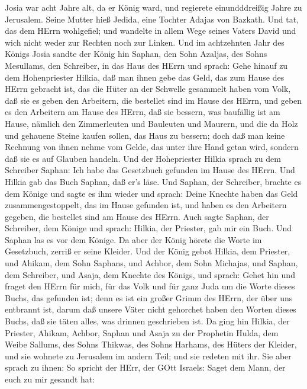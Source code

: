  Josia war acht Jahre alt, da er König ward, und regierete
einundddreißig Jahre zu Jerusalem. Seine Mutter hieß Jedida, eine
Tochter Adajas von Bazkath.  Und tat, das dem HErrn
wohlgefiel; und wandelte in allem Wege seines Vaters David und wich
nicht weder zur Rechten noch zur Linken.  Und im achtzehnten
Jahr des Königs Josia sandte der König hin Saphan, den Sohn Azaljas, des
Sohns Mesullams, den Schreiber, in das Haus des HErrn und sprach:
 Gehe hinauf zu dem Hohenpriester Hilkia, daß man ihnen gebe
das Geld, das zum Hause des HErrn gebracht ist, das die Hüter an der
Schwelle gesammelt haben vom Volk,  daß sie es geben den
Arbeitern, die bestellet sind im Hause des HErrn, und geben es den
Arbeitern am Hause des HErrn, daß sie bessern, was baufällig ist am
Hause,  nämlich den Zimmerleuten und Bauleuten und Maurern,
und die da Holz und gehauene Steine kaufen sollen, das Haus zu bessern;
 doch daß man keine Rechnung von ihnen nehme vom Gelde, das
unter ihre Hand getan wird, sondern daß sie es auf Glauben handeln.
 Und der Hohepriester Hilkia sprach zu dem Schreiber Saphan:
Ich habe das Gesetzbuch gefunden im Hause des HErrn. Und Hilkia gab das
Buch Saphan, daß er's läse.  Und Saphan, der Schreiber,
brachte es dem Könige und sagte es ihm wieder und sprach: Deine Knechte
haben das Geld zusammengestoppelt, das im Hause gefunden ist, und haben
es den Arbeitern gegeben, die bestellet sind am Hause des HErrn.
 Auch sagte Saphan, der Schreiber, dem Könige und sprach:
Hilkia, der Priester, gab mir ein Buch. Und Saphan las es vor dem
Könige.  Da aber der König hörete die Worte im Gesetzbuch,
zerriß er seine Kleider.  Und der König gebot Hilkia, dem
Priester, und Ahikam, dem Sohn Saphans, und Achbor, dem Sohn Michajas,
und Saphan, dem Schreiber, und Asaja, dem Knechte des Königs, und
sprach:  Gehet hin und fraget den HErrn für mich, für das
Volk und für ganz Juda um die Worte dieses Buchs, das gefunden ist; denn
es ist ein großer Grimm des HErrn, der über uns entbrannt ist, darum daß
unsere Väter nicht gehorchet haben den Worten dieses Buchs, daß sie
täten alles, was drinnen geschrieben ist.  Da ging hin
Hilkia, der Priester, Ahikam, Achbor, Saphan und Asaja zu der Prophetin
Hulda, dem Weibe Sallums, des Sohns Thikwas, des Sohns Harhams, des
Hüters der Kleider, und sie wohnete zu Jerusalem im andern Teil; und sie
redeten mit ihr.  Sie aber sprach zu ihnen: So spricht der
HErr, der GOtt Israels: Saget dem Mann, der euch zu mir gesandt hat:
